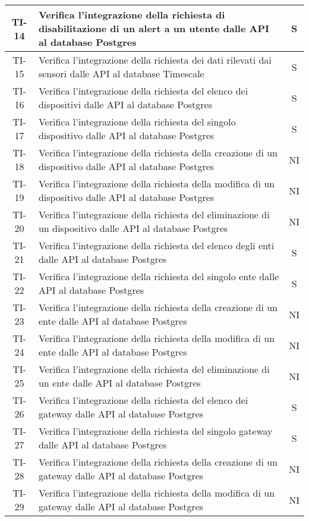 \begin{center}
\begin{longtable}{|c|p{12cm}|c|}
			\hline
			TI-14 & Verifica l'integrazione della richiesta di disabilitazione di un alert a un utente dalle API al database Postgres & S \\
			\hline
			TI-15 & Verifica l'integrazione della richiesta dei dati rilevati dai sensori dalle API al database Timescale & S \\
			\hline
			TI-16 & Verifica l'integrazione della richiesta del elenco dei dispositivi dalle API al database Postgres & S \\
			\hline
			TI-17 & Verifica l'integrazione della richiesta del singolo dispositivo dalle API al database Postgres & S \\
			\hline
			TI-18 & Verifica l'integrazione della richiesta della creazione di un dispositivo dalle API al database Postgres & NI \\
			\hline
			TI-19 & Verifica l'integrazione della richiesta della modifica di un dispositivo dalle API al database Postgres & NI \\
			\hline
			TI-20 & Verifica l'integrazione della richiesta del eliminazione di un dispositivo dalle API al database Postgres & NI \\
			\hline
			TI-21 & Verifica l'integrazione della richiesta del elenco degli enti dalle API al database Postgres & S \\
			\hline
			TI-22 & Verifica l'integrazione della richiesta del singolo ente dalle API al database Postgres & S \\
			\hline
			TI-23 & Verifica l'integrazione della richiesta della creazione di un ente dalle API al database Postgres & NI \\
			\hline
			TI-24 & Verifica l'integrazione della richiesta della modifica di un ente dalle API al database Postgres & NI \\
			\hline
			TI-25 & Verifica l'integrazione della richiesta del eliminazione di un ente dalle API al database Postgres & NI \\
			\hline
			TI-26 & Verifica l'integrazione della richiesta del elenco dei gateway dalle API al database Postgres & S \\
			\hline
			TI-27 & Verifica l'integrazione della richiesta del singolo gateway dalle API al database Postgres & S \\
			\hline
			TI-28 & Verifica l'integrazione della richiesta della creazione di un gateway dalle API al database Postgres & NI \\
			\hline
			TI-29 & Verifica l'integrazione della richiesta della modifica di un gateway dalle API al database Postgres & NI \\

\end{longtable}
\end{center}
